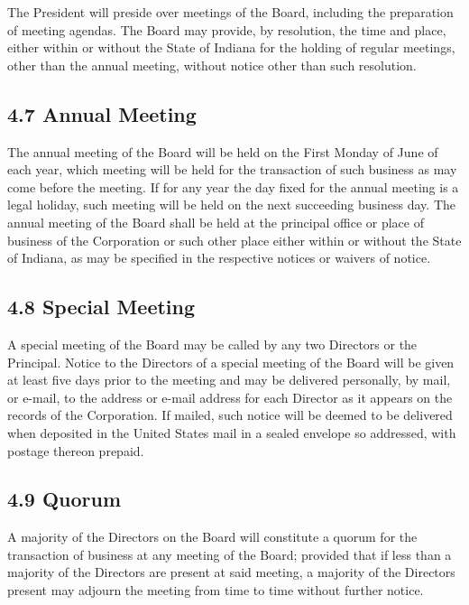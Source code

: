 \documentclass[
]{book}
\begin{document}
The President will preside over meetings of the Board, including the preparation of meeting agendas. The Board may provide, by resolution, the time and place, either within or without the State of Indiana for the holding of regular meetings, other than the annual meeting, without notice other than such resolution.

\subsection{4.7 Annual Meeting}\label{annual-meeting}

The annual meeting of the Board will be held on the First Monday of June of each year, which meeting will be held for the transaction of such business as may come before the meeting. If for any year the day fixed for the annual meeting is a legal holiday, such meeting will be held on the next succeeding business day. The annual meeting of the Board shall be held at the principal office or place of business of the Corporation or such other place either within or without the State of Indiana, as may be specified in the respective notices or waivers of notice.

\subsection{4.8 Special Meeting}\label{special-meeting}

A special meeting of the Board may be called by any two Directors or the Principal. Notice to the Directors of a special meeting of the Board will be given at least five days prior to the meeting and may be delivered personally, by mail, or e-mail, to the address or e-mail address for each Director as it appears on the records of the Corporation. If mailed, such notice will be deemed to be delivered when deposited in the United States mail in a sealed envelope so addressed, with postage thereon prepaid.

\subsection{4.9 Quorum}\label{quorum}

A majority of the Directors on the Board will constitute a quorum for the transaction of business at any meeting of the Board; provided that if less than a majority of the Directors are present at said meeting, a majority of the Directors present may adjourn the meeting from time to time without further notice.
\end{document}
